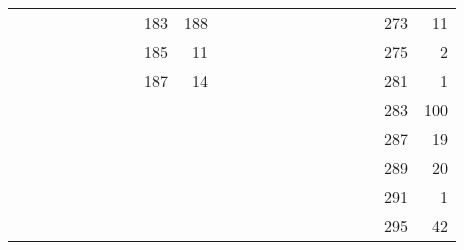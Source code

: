 \documentclass[a4paper,12pt]{article}
\begin{document}
\begin{landscape}
\begin{table}
\begin{tabular}{rrrrrrrrrrrrrrrrrrrrrr}
           &            &            &            &            &            &            &            &        183 &        188 &            &            &            &            &            &            &            &            &            &            &        273 &         11 \\

           &            &            &            &            &            &            &            &        185 &         11 &            &            &            &            &            &            &            &            &            &            &        275 &          2 \\

           &            &            &            &            &            &            &            &        187 &         14 &            &            &            &            &            &            &            &            &            &            &        281 &          1 \\

           &            &            &            &            &            &            &            &            &            &            &            &            &            &            &            &            &            &            &            &        283 &        100 \\

           &            &            &            &            &            &            &            &            &            &            &            &            &            &            &            &            &            &            &            &        287 &         19 \\

           &            &            &            &            &            &            &            &            &            &            &            &            &            &            &            &            &            &            &            &        289 &         20 \\

           &            &            &            &            &            &            &            &            &            &            &            &            &            &            &            &            &            &            &            &        291 &          1 \\

           &            &            &            &            &            &            &            &            &            &            &            &            &            &            &            &            &            &            &            &        295 &         42 \\


\end{tabular}
\end{table}
\end{landscape}
\end{document}

